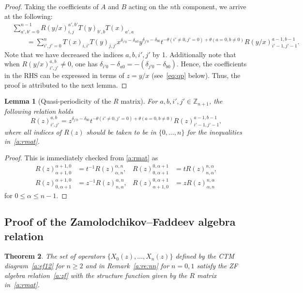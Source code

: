 \documentclass[11pt]{article}
\newtheorem{theo}{Theorem}[section]
\newtheorem{lemma}[theo]{Lemma}
\theoremstyle{definition}
\numberwithin{equation}{section}
\newcommand{\Z}{{\mathbb Z}}
\begin{document}
\begin{proof}
Taking the coefficients of $A$ and $B$ acting on the $n$th component, we arrive at the following:
\begin{align*}
&\sum_{a',b'=0}^{n-1}R(y/x)_{i, j}^{a', b'}T(y)_{b',b}T(x)_{a',a} \\
& \hspace{25pt} = \sum_{i',j'=0}^nT(x)_{i,i'}T(y)_{j,j'} x^{\delta_{i'0}-\delta_{a0}}y^{\delta_{j'0}-\delta_{b0}}
t^{-\theta(i'\ne0,j'=0)+\theta(a=0,b\ne0)}R(y/x)_{i'-1,j'-1}^{a-1,b-1}.
\end{align*}
Note that we have decreased the indices $a,b,i',j'$ by 1.
Additionally note that when $R(y/x)_{i', j'}^{a, b}\neq 0$, one has $\delta_{i'0}-\delta_{a0}=-(\delta_{j'0}-\delta_{b0})$.
Hence, the coefficients in the RHS can be expressed in terms of $z = y/x$ (see~\eqref{eq:qp} below).
Thus, the proof is attributed to the next lemma.
\end{proof}



\begin{lemma}[Quasi-periodicity of the $R$ matrix]
For $a,b,i',j' \in \Z_{n+1}$, the following relation holds
\begin{equation}
\label{eq:qp}
R(z)_{i', j'}^{a, b} = z^{\delta_{j'0}-\delta_{b0}} t^{-\theta(i'\ne0,j'=0)+\theta(a=0,b\ne0)}R(z)_{i'-1,j'-1}^{a-1,b-1},
\end{equation}
where all indices of $R(z)$ should be taken to be in $\{0,\ldots, n\}$ for the inequalities in~\eqref{a:rmat}.
\end{lemma}

\begin{proof}
This is immediately checked from \eqref{a:rmat} as   
\begin{align*}
R(z)^{\alpha+1,0}_{\alpha+1,0}&=t^{-1}R(z)^{\alpha, n}_{\alpha, n},
&
R(z)^{0,\alpha+1}_{0,\alpha+1}&=tR(z)^{n,\alpha}_{n,\alpha},
\\
R(z)^{\alpha+1,0}_{0,\alpha+1} &= z^{-1}R(z)^{\alpha, n}_{n,\alpha},
&
R(z)_{\alpha+1,0}^{0,\alpha+1} &= zR(z)_{\alpha, n}^{n,\alpha}
\end{align*}
for $0 \le \alpha \le n-1$.
\end{proof}

\subsection{Proof of the Zamolodchikov--Faddeev algebra relation}

\begin{theo}\label{a:th:zf}
The set of operators $\{X_0(z), \ldots, X_n(z)\}$ defined by the CTM diagram~\eqref{a:ef12} for $n \ge 2$ and in Remark~\ref{a:re:nn} for $n=0,1$ satisfy the ZF algebra relation~\eqref{a:zf} with the structure function given by the $R$ matrix in~\eqref{a:rmat}.
\end{theo}
\end{document}
